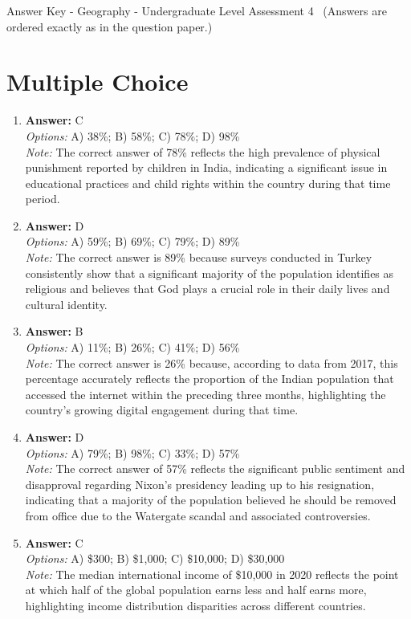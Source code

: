 \documentclass[12pt]{article}
\begin{document}
\begin{center}
Answer Key - Geography - Undergraduate Level Assessment 4 \
\small (Answers are ordered exactly as in the question paper.)
\end{center}

\section*{Multiple Choice}
\begin{enumerate}[label=\arabic*.]
\item \textbf{Answer:} C
\\ \textit{Options:} A) 38\%; B) 58\%; C) 78\%; D) 98\%
\\ \textit{Note:} The correct answer of 78\% reflects the high prevalence of physical punishment reported by children in India, indicating a significant issue in educational practices and child rights within the country during that time period.
\item \textbf{Answer:} D
\\ \textit{Options:} A) 59\%; B) 69\%; C) 79\%; D) 89\%
\\ \textit{Note:} The correct answer is 89\% because surveys conducted in Turkey consistently show that a significant majority of the population identifies as religious and believes that God plays a crucial role in their daily lives and cultural identity.
\item \textbf{Answer:} B
\\ \textit{Options:} A) 11\%; B) 26\%; C) 41\%; D) 56\%
\\ \textit{Note:} The correct answer is 26\% because, according to data from 2017, this percentage accurately reflects the proportion of the Indian population that accessed the internet within the preceding three months, highlighting the country's growing digital engagement during that time.
\item \textbf{Answer:} D
\\ \textit{Options:} A) 79\%; B) 98\%; C) 33\%; D) 57\%
\\ \textit{Note:} The correct answer of 57\% reflects the significant public sentiment and disapproval regarding Nixon's presidency leading up to his resignation, indicating that a majority of the population believed he should be removed from office due to the Watergate scandal and associated controversies.
\item \textbf{Answer:} C
\\ \textit{Options:} A) \$300; B) \$1,000; C) \$10,000; D) \$30,000
\\ \textit{Note:} The median international income of \$10,000 in 2020 reflects the point at which half of the global population earns less and half earns more, highlighting income distribution disparities across different countries.
\end{enumerate}
\end{document}
